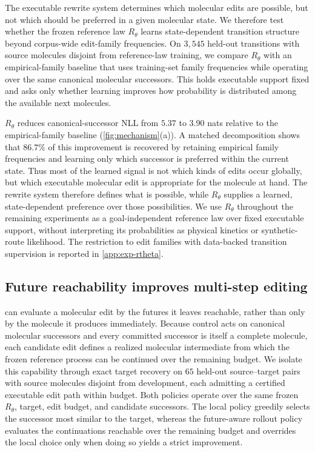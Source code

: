The executable rewrite system determines which molecular edits are possible, but not which should be preferred in a given molecular state. We therefore test whether the frozen reference law $R_\theta$ learns state-dependent transition structure beyond corpus-wide edit-family frequencies. On $3{,}545$ held-out transitions with source molecules disjoint from reference-law training, we compare $R_\theta$ with an empirical-family baseline that uses training-set family frequencies while operating over the same canonical molecular successors. This holds executable support fixed and asks only whether learning improves how probability is distributed among the available next molecules.

$R_\theta$ reduces canonical-successor NLL from $5.37$ to $3.90$ nats relative to the empirical-family baseline (\cref{fig:mechanism}(a)). A matched decomposition shows that $86.7\%$ of this improvement is recovered by retaining empirical family frequencies and learning only which successor is preferred within the current state. Thus most of the learned signal is not which kinds of edits occur globally, but which executable molecular edit is appropriate for the molecule at hand. The rewrite system therefore defines what is possible, while $R_\theta$ supplies a learned, state-dependent preference over those possibilities. We use $R_\theta$ throughout the remaining experiments as a goal-independent reference law over fixed executable support, without interpreting its probabilities as physical kinetics or synthetic-route likelihood. The restriction to edit families with data-backed transition supervision is reported in \cref{app:exp-rtheta}.

\subsection{Future reachability improves multi-step editing}
\label{sec:gem-exp-lookahead}

\method{} can evaluate a molecular edit by the futures it leaves reachable, rather than only by the molecule it produces immediately. Because control acts on canonical molecular successors and every committed successor is itself a complete molecule, each candidate edit defines a realized molecular intermediate from which the frozen reference process can be continued over the remaining budget. We isolate this capability through exact target recovery on $65$ held-out source--target pairs with source molecules disjoint from development, each admitting a certified executable edit path within budget. Both policies operate over the same frozen $R_\theta$, target, edit budget, and candidate successors. The local policy greedily selects the successor most similar to the target, whereas the future-aware rollout policy evaluates the continuations reachable over the remaining budget and overrides the local choice only when doing so yields a strict improvement.

